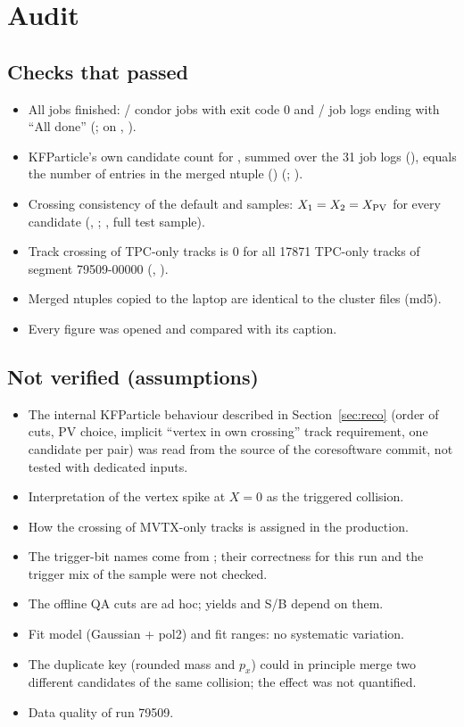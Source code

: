 \section{Audit}
\label{sec:audit}

\subsection{Checks that passed}
\begin{itemize}\setlength\itemsep{1pt}
\item All jobs finished: \nCondorOK/\nCondorJobs{} condor jobs with exit code 0 and \nKFPdone/\nKFPlogs{}
  job logs ending with ``All done'' (\checkLogsDone;  on
  , ).
\item KFParticle's own candidate count for \Ks, summed over the 31 job logs (\nCandKsFromLogs), equals the
  number of entries in the merged ntuple (\nCandKs) (\checkCandLogs; ).
\item Crossing consistency of the default \Ks{} and \Lam{} samples: $X_1=X_2=X_{\rm PV}$ for every
  candidate (\checkXKs, \checkXLambda; , full test sample).
\item Track crossing of TPC-only tracks is 0 for all 17871 TPC-only tracks of segment 79509-00000
  (, ).
\item Merged ntuples copied to the laptop are identical to the cluster files (md5).
\item Every figure was opened and compared with its caption.
\end{itemize}

\subsection{Not verified (assumptions)}
\begin{itemize}\setlength\itemsep{1pt}
\item The internal KFParticle behaviour described in Section~\ref{sec:reco} (order of cuts, PV choice,
  implicit ``vertex in own crossing'' track requirement, one candidate per pair) was read from the
  source of the coresoftware commit, not tested with dedicated inputs.
\item Interpretation of the vertex spike at $X=0$ as the triggered collision.
\item How the crossing of MVTX-only tracks is assigned in the production.
\item The trigger-bit names come from ; their correctness for this run and the
  trigger mix of the sample were not checked.
\item The offline QA cuts are ad hoc; yields and S/B depend on them.
\item Fit model (Gaussian + pol2) and fit ranges: no systematic variation.
\item The duplicate key (rounded mass and $p_x$) could in principle merge two different candidates of
  the same collision; the effect was not quantified.
\item Data quality of run 79509.
\end{itemize}
